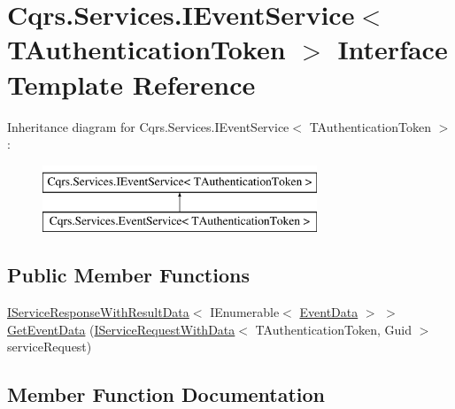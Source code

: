 \hypertarget{interfaceCqrs_1_1Services_1_1IEventService}{}\section{Cqrs.\+Services.\+I\+Event\+Service$<$ T\+Authentication\+Token $>$ Interface Template Reference}
\label{interfaceCqrs_1_1Services_1_1IEventService}
Inheritance diagram for Cqrs.\+Services.\+I\+Event\+Service$<$ T\+Authentication\+Token $>$\+:\begin{figure}[H]
\begin{center}
\leavevmode
\includegraphics[height=2.000000cm]{interfaceCqrs_1_1Services_1_1IEventService}
\end{center}
\end{figure}
\subsection*{Public Member Functions}
\begin{DoxyCompactItemize}
\item 
\hyperlink{interfaceCqrs_1_1Services_1_1IServiceResponseWithResultData}{I\+Service\+Response\+With\+Result\+Data}$<$ I\+Enumerable$<$ \hyperlink{classCqrs_1_1Events_1_1EventData}{Event\+Data} $>$ $>$ \hyperlink{interfaceCqrs_1_1Services_1_1IEventService_aa41b82bc398bfab0b2fd519d7f067946_aa41b82bc398bfab0b2fd519d7f067946}{Get\+Event\+Data} (\hyperlink{interfaceCqrs_1_1Services_1_1IServiceRequestWithData}{I\+Service\+Request\+With\+Data}$<$ T\+Authentication\+Token, Guid $>$ service\+Request)
\end{DoxyCompactItemize}


\subsection{Member Function Documentation}
\mbox{\label{interfaceCqrs_1_1Services_1_1IEventService_aa41b82bc398bfab0b2fd519d7f067946_aa41b82bc398bfab0b2fd519d7f067946}} 
